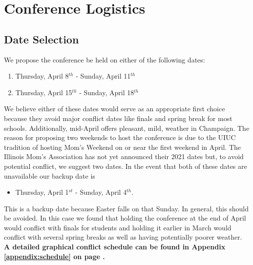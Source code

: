 
\section{Conference Logistics}

\subsection{Date Selection}


We propose the conference be held on either of the following dates: 
\begin{enumerate}
	\item Thursday, April 8$^{th}$ - Sunday, April 11$^{th}$ 
	\item Thursday, April 15$^{th}$ - Sunday, April 18$^{th}$
\end{enumerate}
We believe either of these dates would serve as an appropriate first choice because they avoid major conflict dates like finals and spring break for most schools. Additionally, mid-April offers pleasant, mild, weather in Champaign. The reason for proposing two weekends to host the conference is due to the UIUC tradition of hosting Mom's Weekend on or near the first weekend in April. The Illinois Mom's Association has not yet announced their 2021 dates but, to avoid potential conflict, we suggest two dates. In the event that both of these dates are unavailable our backup date is 
\begin{itemize}
	\item Thursday, April 1$^{st}$ - Sunday, April 4$^{th}$.  
\end{itemize}
This is a backup date because Easter falls on that Sunday. In general, this 
should be avoided. In this case we found that holding the conference at the end 
of April would conflict with finals for students and holding it earlier in 
March would conflict with several spring breaks as well as having potentially 
poorer weather. \textbf{A detailed graphical conflict schedule can be found in Appendix 
\ref{appendix:schedule} on page \pageref{appendix:schedule}.} 

